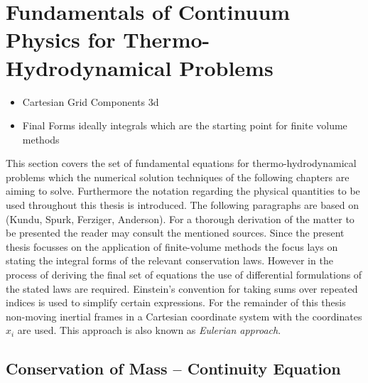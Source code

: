 
  \section{Fundamentals of Continuum Physics for Thermo-Hydrodynamical Problems}

    \begin{itemize}
        \item Cartesian Grid Components 3d
        \item Final Forms ideally integrals which are the starting point for finite volume methods
      \end{itemize}

      This section covers the set of fundamental equations for thermo-hydrodynamical problems which the numerical solution techniques of the following chapters are aiming to solve. Furthermore the notation regarding the physical quantities to be used throughout this thesis is introduced. The following paragraphs are based on (Kundu, Spurk, Ferziger, Anderson). For a thorough derivation of the matter to be presented the reader may consult the mentioned sources. Since the present thesis focusses on the application of finite-volume methods the focus lays on stating the integral forms of the relevant conservation laws. However in the process of deriving the final set of equations the use of differential formulations of the stated laws are required. Einstein's convention for taking sums over repeated indices is used to simplify certain expressions. For the remainder of this thesis non-moving inertial frames in a Cartesian coordinate system with the coordinates \( x_i \) are used. This approach is also known as \textit{Eulerian approach}.  

    \subsection{Conservation of Mass -- Continuity Equation}

